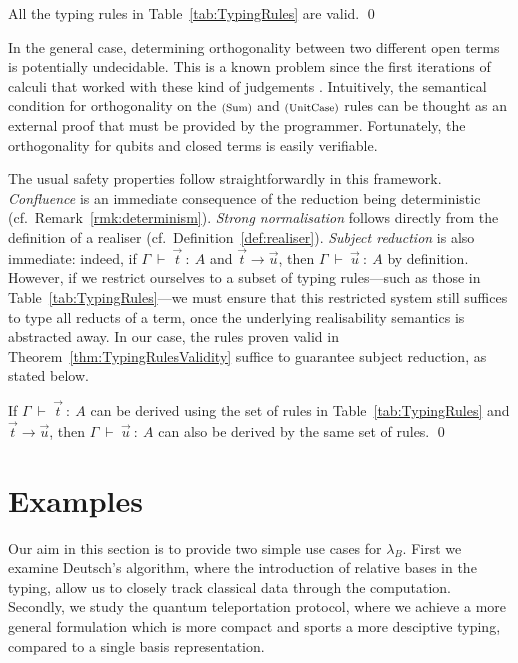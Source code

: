\documentclass[a4paper,UKenglish,numberwithinsect,pdfa,anonymous]{lipics-v2021}
\theoremstyle{restatestyle}
\def\TYP#1#2#3{#1~{\vdash}~#2~{:}~#3}
\def\snam#1{\textsc{\scriptsize\upshape(#1)}}
\newcommand{\lambdaB}{\lambda_B}
\begin{document}
\begin{theorem}\label{thm:TypingRulesValidity}
  All the typing rules in Table~\ref{tab:TypingRules} are valid.
  \qed
\end{theorem}

In the general case, determining orthogonality between two different open terms
is potentially undecidable. This is a known problem since the first iterations
of calculi that worked with these kind of judgements \cite{AltenkirchGrattageLICS05}.
Intuitively, the semantical condition for orthogonality on the $\snam{Sum}$ and
$\snam{UnitCase}$ rules can be thought as an external proof that must be provided by
the programmer. Fortunately, the orthogonality for qubits and closed terms is easily
verifiable.

The usual safety properties follow straightforwardly in this framework.
\emph{Confluence} is an immediate consequence of the reduction being
deterministic (cf.~Remark~\ref{rmk:determinism}).  
\emph{Strong normalisation} follows directly from the definition of a
realiser (cf.~Definition~\ref{def:realiser}).  
\emph{Subject reduction} is also immediate: indeed, if
$\TYP{\Gamma}{\vec{t}}{A}$ and $\vec{t}\to\vec{u}$, then
$\TYP{\Gamma}{\vec{u}}{A}$ by definition.
However, if we restrict ourselves to a subset of typing rules—such as those in Table~\ref{tab:TypingRules}—we must
ensure that this restricted system still suffices to type all reducts of a
term, once the underlying realisability semantics is abstracted away.  In our
case, the rules proven valid in Theorem~\ref{thm:TypingRulesValidity}
suffice to guarantee subject reduction, as
stated below.


\begin{theorem}\label{thm:SubjectReduction}
  If $\TYP{\Gamma}{\vec{t}}{A}$ can be derived using the set of rules in
  Table~\ref{tab:TypingRules} and $\vec{t}\to\vec{u}$, then
  $\TYP{\Gamma}{\vec{u}}{A}$ can also be derived by the same set of rules.
  \qed
\end{theorem}

\section{Examples}\label{sec:examples}
Our aim in this section is to provide two simple use cases for $\lambdaB$.
First we examine Deutsch's algorithm, where the introduction of relative
bases in the typing, allow us to closely track classical data through the
computation. Secondly, we study the quantum teleportation protocol, where
we achieve a more general formulation which is more compact and sports
a more desciptive typing, compared to a single basis representation.
\end{document}
